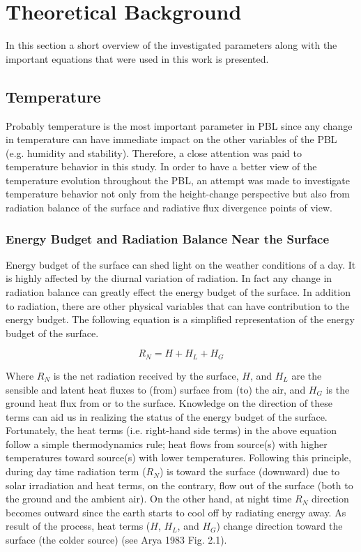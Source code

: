\documentclass[a4paper,12pt]{article}
\numberwithin{equation}{section} %
\begin{document}
\newpage

\section{Theoretical Background}

In this section a short overview of the investigated parameters along with the important equations that were used in this work is presented.

\subsection{Temperature}

Probably temperature is the most important parameter in PBL since any change in temperature can have immediate impact on the other variables of the PBL (e.g. humidity and stability). Therefore, a close attention was paid to temperature behavior in this study. In order to have a better view of the temperature evolution throughout the PBL, an attempt was made to investigate temperature behavior not only from the height-change perspective but also from radiation balance of the surface and radiative flux divergence points of view. 

\subsubsection{Energy Budget and Radiation Balance Near the Surface}

Energy budget of the surface can shed light on the weather conditions of a day. It is highly affected by the diurnal variation of radiation. In fact any change in radiation balance can greatly effect the energy budget of the surface. In addition to radiation, there are other physical variables that can have contribution to the energy budget. The following equation is a simplified representation of the energy budget of the surface.

\vspace{0.25cm}
\begin{equation}\label{eq:budget}
R_N = H + H_L + H_G
\end{equation}
\vspace{0.25cm}

Where $R_N$ is the net radiation received by the surface, $H$, and $H_L$ are the sensible and latent heat fluxes to (from) surface from (to) the air, and $H_G$ is the ground heat flux from or to the surface. Knowledge on the direction of these terms can aid us in realizing the status of the energy budget of the surface. Fortunately, the heat terms (i.e. right-hand side terms) in the above equation follow a simple thermodynamics rule; heat flows from source(s) with higher temperatures toward source(s) with lower temperatures. Following this principle, during day time radiation term ($R_N$) is toward the surface (downward) due to solar irradiation and heat terms, on the contrary, flow out of the surface (both to the ground and the ambient air). On the other hand, at night time $R_N$ direction becomes outward since the earth starts to cool off by radiating energy away. As result of the process, heat terms ($H$, $H_L$, and $H_G$) change direction toward the surface (the colder source) (see Arya 1983 Fig. 2.1).
\end{document}
